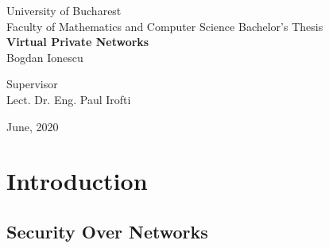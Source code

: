 \documentclass[a4paper,12pt]{report}
\begin{document}
	\begin{titlepage}
		\begin{center}
			\vspace{-10in}
			{\LARGE University of Bucharest \\
			Faculty of Mathematics and Computer Science }
			\vfill
			{\large Bachelor's Thesis} \\
			\vspace{10mm}
			\textbf{\huge Virtual Private Networks} \\
			{\Large Bogdan Ionescu} \\
			\vspace{20mm}
			\begin{flushleft}{\large Supervisor \\
			Lect. Dr. Eng. Paul Irofti}
			\end{flushleft}
			\vfill
			June, 2020
		\restoregeometry
		\end{center}
	\end{titlepage}
	\author{Bogdan Ionescu}
	\date{\today}
	
	\begin{abstract}
		This thesis aims to describe different potential security vulnerabilities when using public networks, such as the Internet, as well as suitable methods on how they can be resolved. The first chapter presents the dangers one might encounter while traversing public networks and how VPNs make use of tunneling protocols to mitigate them. We then take a deep dive into IPsec, a very popular and adaptable network protocol suite designed to address a plethora of security needs for both casual users and businesses. Finally, a software application written in the Go programming language is outlined, with the purpose of demonstrating how securing network traffic would be implemented.
	\end{abstract}		
	
	\tableofcontents
	
	\setlength{\glsdescwidth}{\hsize}
	\glsaddall
	\printglossary[type=\acronymtype,nonumberlist]
	
	\chapter{Introduction}
	
	\section{Security Over Networks}
		
\end{document}
